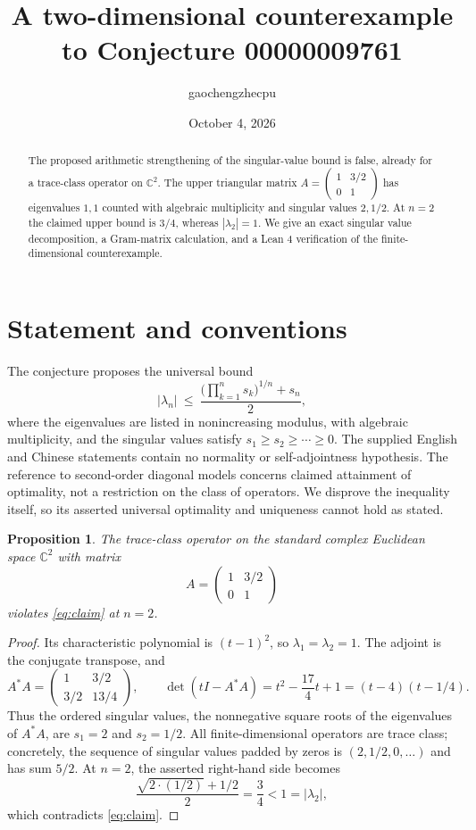 \documentclass[11pt]{article}
\title{A two-dimensional counterexample to Conjecture 00000009761}
\author{gaochengzhecpu}
\date{October 4, 2026}
\newtheorem{proposition}{Proposition}
\begin{document}
\maketitle
\begin{abstract}
The proposed arithmetic strengthening of the singular-value bound is false,
already for a trace-class operator on $\mathbb C^2$. The upper triangular
matrix $A=\left(\begin{smallmatrix}1&3/2\\0&1\end{smallmatrix}\right)$
has eigenvalues $1,1$ counted with algebraic multiplicity and singular
values $2,1/2$. At $n=2$ the claimed upper bound is $3/4$, whereas
$|\lambda_2|=1$. We give an exact singular value decomposition, a
Gram-matrix calculation, and a Lean 4 verification of the finite-dimensional
counterexample.
\end{abstract}

\section{Statement and conventions}
The conjecture proposes the universal bound
\begin{equation}\label{eq:claim}
 |\lambda_n|\ \leq\ \frac{\bigl(\prod_{k=1}^{n}s_k\bigr)^{1/n}+s_n}{2},
\end{equation}
where the eigenvalues are listed in nonincreasing modulus, with algebraic
multiplicity, and the singular values satisfy $s_1\geq s_2\geq\cdots\geq0$.
The supplied English and Chinese statements contain no normality or
self-adjointness hypothesis. The reference to second-order diagonal models
concerns claimed attainment of optimality, not a restriction on the class
of operators. We disprove the inequality itself, so its asserted universal
optimality and uniqueness cannot hold as stated.

\begin{proposition}
The trace-class operator on the standard complex Euclidean space $\mathbb C^2$
with matrix
\[
 A=\begin{pmatrix}1&3/2\\0&1\end{pmatrix}
\]
violates \eqref{eq:claim} at $n=2$.
\end{proposition}
\begin{proof}
Its characteristic polynomial is $(t-1)^2$, so $\lambda_1=\lambda_2=1$.
The adjoint is the conjugate transpose, and
\[
 A^*A=\begin{pmatrix}1&3/2\\3/2&13/4\end{pmatrix},\qquad
 \det(tI-A^*A)=t^2-\frac{17}{4}t+1
              =(t-4)(t-1/4).
\]
Thus the ordered singular values, the nonnegative square roots of the
eigenvalues of $A^*A$, are $s_1=2$ and $s_2=1/2$.
All finite-dimensional operators are trace class; concretely, the sequence
of singular values padded by zeros is $(2,1/2,0,\ldots)$ and has sum $5/2$.
At $n=2$, the asserted right-hand side becomes
\[
 \frac{\sqrt{2\cdot(1/2)}+1/2}{2}=\frac34<1=|\lambda_2|,
\]
which contradicts \eqref{eq:claim}.
\end{proof}
\end{document}
